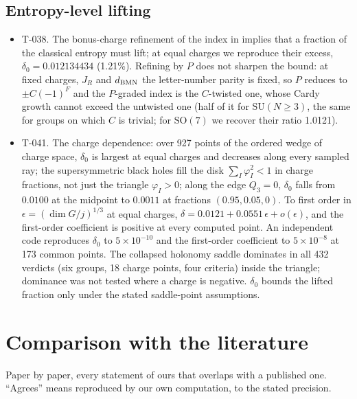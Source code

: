 \documentclass[11pt]{article}
\newcommand{\T}[1]{\textsf{T-0#1}}
\newcommand{\SU}{\mathrm{SU}}
\newcommand{\SO}{\mathrm{SO}}
\begin{document}
\subsection{Entropy-level lifting}\label{sec:entropy}

\begin{itemize}
\item \T{38}. The bonus-charge refinement of the index in \cite{KKLP} implies that a fraction of the classical entropy
must lift; at equal charges we reproduce their excess, $\delta_0=0.012134434$ (1.21\%). Refining by $P$ does not
sharpen the bound: at fixed charges, $J_R$ and $d_{\rm BMN}$ the letter-number parity is fixed, so $P$ reduces to
$\pm C(-1)^F$ and the $P$-graded index is the $C$-twisted one, whose Cardy growth cannot exceed the untwisted one (half
of it for $\SU(N\ge3)$, the same for groups on which $C$ is trivial; for $\SO(7)$ we recover their ratio 1.0121).
\item \T{41}. The charge dependence: over 927 points of the ordered wedge of charge space, $\delta_0$ is largest at
equal charges and decreases along every sampled ray; the supersymmetric black holes fill the disk
$\sum_I\varphi_I^2<1$ in charge fractions, not just the triangle $\varphi_I>0$; along the edge $Q_3=0$, $\delta_0$
falls from $0.0100$ at the midpoint to $0.0011$ at fractions $(0.95,0.05,0)$. To first order in
$\epsilon=(\dim G/j)^{1/3}$ at equal charges, $\delta=0.0121+0.0551\,\epsilon+o(\epsilon)$, and the first-order
coefficient is positive at every computed point. An independent code reproduces $\delta_0$ to $5\times10^{-10}$ and the
first-order coefficient to $5\times10^{-8}$ at 173 common points. The collapsed holonomy saddle dominates in all 432
verdicts (six groups, 18 charge points, four criteria) inside the triangle; dominance was not tested where a charge is
negative. $\delta_0$ bounds the lifted fraction only under the stated saddle-point assumptions.
\end{itemize}

\section{Comparison with the literature}\label{sec:literature}

Paper by paper, every statement of ours that overlaps with a published one. ``Agrees'' means reproduced by our own
computation, to the stated precision.
\end{document}

